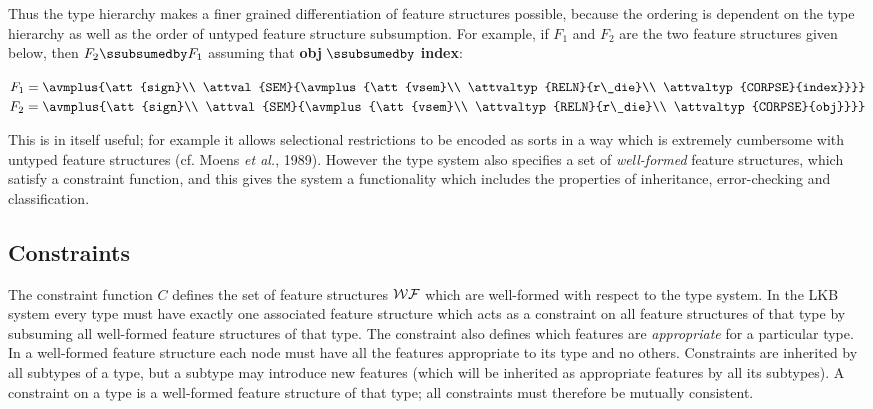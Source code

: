 \documentclass[12pt]{report}
\begin{document}
Thus the type hierarchy makes a finer grained differentiation of 
feature structures possible, because the ordering is dependent on the
type hierarchy as well as the order of untyped 
feature structure subsumption. 
For example, if $F_{1}$ and $F_{2}$ are the two feature structures given
below, then $F_{2} \ssubsumedby F_{1}$ assuming that {\bf obj}
$\ssubsumedby$ {\bf index}:
\begin{center}
{\tiny
$F_{1}=\avmplus{\att{sign}\\
             \attval{SEM}{\avmplus{\att{vsem}\\
                                   \attvaltyp{RELN}{r\_die}\\
                                   \attvaltyp{CORPSE}{index}}}}$
$F_{2}=\avmplus{\att{sign}\\
             \attval{SEM}{\avmplus{\att{vsem}\\
                                   \attvaltyp{RELN}{r\_die}\\
                                   \attvaltyp{CORPSE}{obj}}}}$

}
\end{center}
This is in itself 
useful; for example it allows selectional restrictions to be encoded as 
sorts in a way which is extremely cumbersome with untyped feature
structures
(cf. Moens {\it et al.}, 1989).
However the type system also specifies a set of
{\em well-formed} feature structures, which 
satisfy a constraint function, and this gives the system a functionality
which includes the properties of inheritance, error-checking and 
classification.

\subsection{Constraints}
\label{formcons}

The constraint function $C$ defines the set of feature structures ${\cal WF}$
which are well-formed with respect to the type system.
In the LKB system every type must have exactly one associated
feature structure which acts as a constraint on all feature structures
of that type by subsuming all well-formed feature structures of that
type.  The constraint also defines which features are {\em
appropriate} for a particular type. In a well-formed feature structure 
each node must have
all the features appropriate to its type and no others.  Constraints 
are inherited by
all subtypes of a type, but a subtype may introduce new features
(which will be inherited as appropriate features by all its subtypes).
A constraint on a type is a well-formed feature structure of that
type; all constraints must therefore be mutually consistent.
\end{document}
